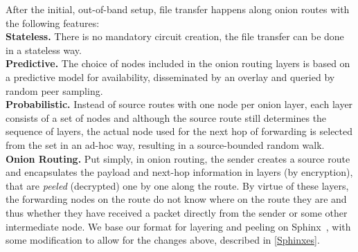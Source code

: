 After the initial, out-of-band setup, file transfer happens along
onion routes with the following features:\\
\textbf{Stateless.} There is no mandatory circuit creation, the file transfer can be
  done in a stateless way. \\
\textbf{Predictive.} The choice of nodes included in the onion routing
  layers is based on a predictive model for availability, disseminated
  by an overlay and queried by random peer sampling.\\
 \textbf{Probabilistic.} Instead of source routes with one node per onion layer, each
  layer consists of a set of nodes and although the source route still
  determines the sequence of layers, the actual node used for the next
  hop of forwarding is selected from the set in an ad-hoc way,
  resulting in a source-bounded random walk.\\
 \textbf{Onion Routing.} Put simply, in onion routing, the sender creates
  a source route and encapsulates the payload and next-hop information in layers (by
  encryption), that are \emph{peeled} (decrypted) one by one along the
  route. By virtue of these layers, the forwarding nodes on the
  route do not know where on the route they are and thus whether they
  have received a packet directly from the sender or some other
  intermediate node. We base our format for layering and peeling on
  Sphinx~\cite{Sphinx}, with some modification to allow for the
  changes above, described in \cref{Sphinxes}.


